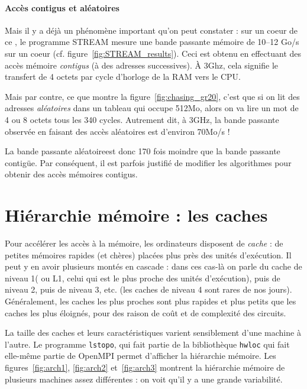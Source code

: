 \paragraph{Accès contigus et aléatoires} Mais il y a déjà un phénomène important
qu'on peut constater : sur un coeur de ce , le programme
\textsf{STREAM} mesure une bande passante mémoire de 10--12 Go/s sur un coeur
(cf. figure~\ref{fig:STREAM_results}). Ceci est obtenu en effectuant des accès
mémoire \emph{contigus} (à des adresses successives). À 3Ghz, cela signifie le
transfert de 4 octets par cycle d'horloge de la RAM vers le CPU.

Mais par contre, ce que montre la figure~\ref{fig:chasing_gr20}, c'est que si on
lit des adresses \emph{aléatoires} dans un tableau qui occupe 512Mo, alors on va
lire un mot de 4 ou 8 octets tous les 340 cycles. Autrement dit, à 3GHz, la
bande passante observée en faisant des accès aléatoires est d'environ 70Mo/s !

La bande passante \og aléatoire\fg est donc 170 fois moindre que la bande
passante \og contigüe\fg. Par conséquent, il est parfois justifié de modifier
les algorithmes pour obtenir des accès mémoires contigus.


\section{Hiérarchie mémoire : les caches}

Pour accélérer les accès à la mémoire, les ordinateurs disposent de \emph{cache}
: de petites mémoires rapides (et chères) placées plus près des unités
d'exécution. Il peut y en avoir plusieurs montés en cascade : dans ces cas-là on
parle du cache de \og niveau 1\fg ( ou L1, celui qui est le
plus proche des unités d'exécution), puis de niveau 2, puis de niveau 3,
etc. (les caches de niveau 4 sont rares de nos jours). Généralement, les caches
les plus proches sont plus rapides et plus petits que les caches les plus
éloignés, pour des raison de coût et de complexité des circuits.

La taille des caches et leurs caractéristiques varient sensiblement d'une
machine à l'autre. Le programme \texttt{lstopo}, qui fait partie de la bibliothèque
\texttt{hwloc} qui fait elle-même partie de \textsf{OpenMPI} permet d'afficher
la hiérarchie mémoire. Les figures~\ref{fig:arch1}, \ref{fig:arch2}
et~\ref{fig:arch3} montrent la hiérarchie mémoire de plusieurs machines assez
différentes : on voit qu'il y a une grande variabilité.

